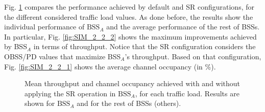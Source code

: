 \documentclass{article}
\begin{document}
Fig. \ref{fig:SIM_2_2} compares the performance achieved by default and SR configurations, for the different considered traffic load values. As done before, the results show the individual performance of $\text{BSS}_A$ and the average performance of the rest of BSSs. In particular, Fig. \ref{fig:SIM_2_2_2} shows the maximum improvements achieved by BSS$_A$ in terms of throughput. Notice that the SR configuration considers the OBSS/PD values that maximize BSS$_A$'s throughput. Based on that configuration, Fig. \ref{fig:SIM_2_2_1} shows the average channel occupancy (in \%).

\begin{figure}[ht!]
	\centering		
	\caption{Mean throughput and channel occupancy achieved with and without applying the SR operation in $\text{BSS}_A$, for each traffic load. Results are shown for $\text{BSS}_A$ and for the rest of BSSs (others).}
	\label{fig:SIM_2_2}
\end{figure}
\end{document}
